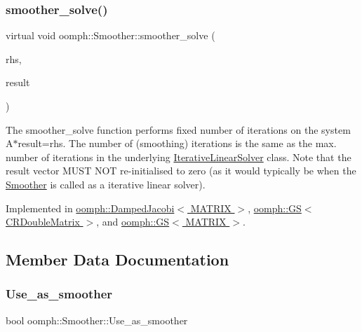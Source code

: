 \subsubsection{\texorpdfstring{smoother\+\_\+solve()}{smoother\_solve()}}
{\footnotesize\ttfamily virtual void oomph\+::\+Smoother\+::smoother\+\_\+solve (\begin{DoxyParamCaption}\item[{const \hyperlink{classoomph_1_1DoubleVector}{Double\+Vector} \&}]{rhs,  }\item[{\hyperlink{classoomph_1_1DoubleVector}{Double\+Vector} \&}]{result }\end{DoxyParamCaption})\hspace{0.3cm}{\ttfamily [pure virtual]}}



The smoother\+\_\+solve function performs fixed number of iterations on the system A$\ast$result=rhs. The number of (smoothing) iterations is the same as the max. number of iterations in the underlying \hyperlink{classoomph_1_1IterativeLinearSolver}{Iterative\+Linear\+Solver} class. Note that the result vector M\+U\+ST N\+OT re-\/initialised to zero (as it would typically be when the \hyperlink{classoomph_1_1Smoother}{Smoother} is called as a iterative linear solver). 



Implemented in \hyperlink{classoomph_1_1DampedJacobi_af1e5baec4c87874bbd2a2834810f92ba}{oomph\+::\+Damped\+Jacobi$<$ M\+A\+T\+R\+I\+X $>$}, \hyperlink{classoomph_1_1GS_3_01CRDoubleMatrix_01_4_a0917e59d120fe7c49ecef62806392f6a}{oomph\+::\+G\+S$<$ C\+R\+Double\+Matrix $>$}, and \hyperlink{classoomph_1_1GS_a8707c2bcc7fcaceca2fe93ac471ed1a2}{oomph\+::\+G\+S$<$ M\+A\+T\+R\+I\+X $>$}.



\subsection{Member Data Documentation}
\mbox{\label{classoomph_1_1Smoother_aa789c91e11408d9ffd94c237e4a729b7}} 
\subsubsection{\texorpdfstring{Use\+\_\+as\+\_\+smoother}{Use\_as\_smoother}}
{\footnotesize\ttfamily bool oomph\+::\+Smoother\+::\+Use\+\_\+as\+\_\+smoother\hspace{0.3cm}{\ttfamily [protected]}}



